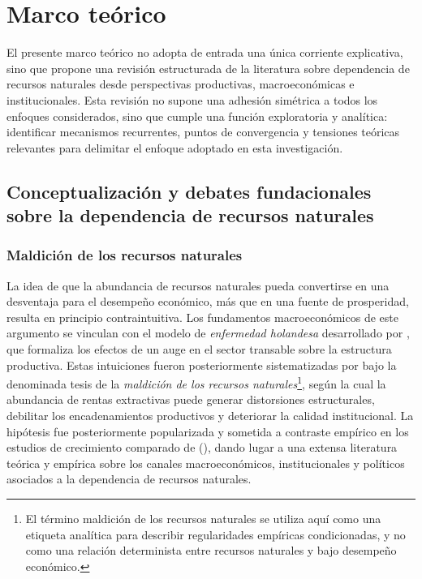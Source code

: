 \documentclass[../../PTFM.tex]{subfiles}
\begin{document}
	\chapter{Marco teórico}
	\label{chap:marco-teorico}
	
	
El presente marco teórico no adopta de entrada una única corriente explicativa, sino que propone una revisión estructurada de la literatura sobre dependencia de recursos naturales desde perspectivas productivas, macroeconómicas e institucionales. Esta revisión no supone una adhesión simétrica a todos los enfoques considerados, sino que cumple una función exploratoria y analítica: identificar mecanismos recurrentes, puntos de convergencia y tensiones teóricas relevantes para delimitar el enfoque adoptado en esta investigación.
	
	\section{Conceptualización y debates fundacionales sobre la dependencia de recursos naturales}
	\label{sec:conceptualizacion-debates}
	
	\subsection{Maldición de los recursos naturales}
	\label{subsec:maldicion-recursos}
	
	La idea de que la abundancia de recursos naturales pueda convertirse en una desventaja para el desempeño económico, más que en una fuente de prosperidad, resulta en principio contraintuitiva. Los fundamentos macroeconómicos de este argumento se vinculan con el modelo de \textit{enfermedad holandesa} desarrollado por \textcite{Corden1982}, que formaliza los efectos de un auge en el sector transable sobre la estructura productiva. Estas intuiciones fueron posteriormente sistematizadas por \textcite{Auty1993} bajo la denominada tesis de la \textit{maldición de los recursos naturales}\footnote{El término maldición de los recursos naturales se utiliza aquí como una etiqueta analítica para describir regularidades empíricas condicionadas, y no como una relación determinista entre recursos naturales y bajo desempeño económico.}, según la cual la abundancia de rentas extractivas puede generar distorsiones estructurales, debilitar los encadenamientos productivos y deteriorar la calidad institucional. La hipótesis fue posteriormente popularizada y sometida a contraste empírico en los estudios de crecimiento comparado de \citeauthor{Sachs1995} (\citeyear{Sachs1995,Sachs1997,Sachs2001}), dando lugar a una extensa literatura teórica y empírica sobre los canales macroeconómicos, institucionales y políticos asociados a la dependencia de recursos naturales.
	
\end{document}
